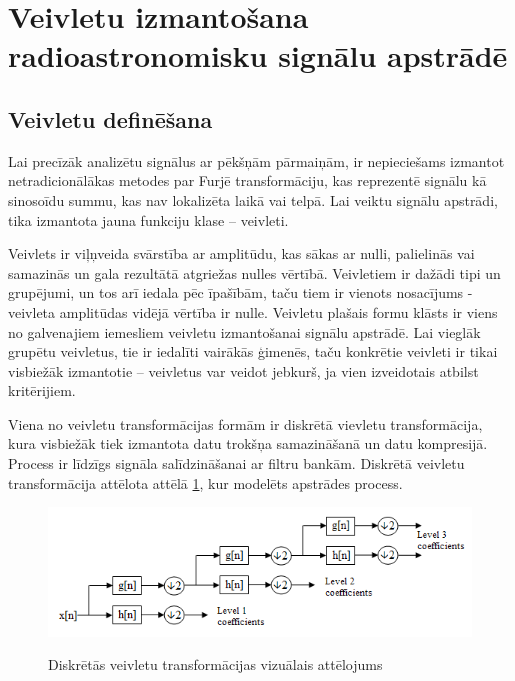 










\section{Veivletu izmantošana radioastronomisku signālu apstrādē} \label{wavelets}
\subsection{Veivletu definēšana}
Lai precīzāk analizētu signālus ar pēkšņām pārmaiņām, ir nepieciešams izmantot netradicionālākas metodes par Furjē transformāciju, kas reprezentē signālu kā sinosoīdu summu, kas nav lokalizēta laikā vai telpā. Lai veiktu signālu apstrādi, tika izmantota jauna funkciju klase – veivleti.  

Veivlets ir viļņveida svārstība ar amplitūdu, kas sākas ar nulli, palielinās vai samazinās un gala rezultātā atgriežas nulles vērtībā. Veivletiem ir dažādi tipi un grupējumi, un tos arī iedala pēc īpašībām, taču tiem ir vienots nosacījums -  veivleta amplitūdas vidējā vērtība ir nulle. Veivletu plašais formu klāsts ir viens no galvenajiem iemesliem veivletu izmantošanai signālu apstrādē. Lai vieglāk grupētu veivletus, tie ir iedalīti vairākās ģimenēs, taču konkrētie veivleti ir tikai visbiežāk izmantotie – veivletus var veidot jebkurš, ja vien izveidotais atbilst kritērijiem. 


Viena no veivletu transformācijas formām ir diskrētā vievletu transformācija, kura visbiežāk tiek izmantota datu trokšņa samazināšanā un datu kompresijā. Process ir līdzīgs signāla salīdzināšanai ar filtru bankām. Diskrētā veivletu transformācija attēlota attēlā \ref{fig:wavelets-dwt}, kur modelēts apstrādes process.

\begin{figure}[h!]
\centering
\includegraphics[width=\textwidth]{images/internet/DWT-fig.png}
\caption{Diskrētās veivletu transformācijas vizuālais attēlojums} \cite{dwt-fig}
\label{fig:wavelets-dwt}

\end{figure}



